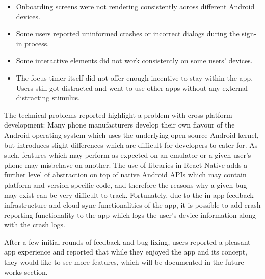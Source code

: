 \begin{itemize}
	\item Onboarding screens were not rendering consistently across different Android devices.
	\item Some users reported uninformed crashes or incorrect dialogs during the sign-in process.
	\item Some interactive elements did not work consistently on some users' devices.
	\item The focus timer itself did not offer enough incentive to stay within the app. Users still got distracted and went to use other apps without any external distracting stimulus.
\end{itemize}

The technical problems reported highlight a problem with cross-platform development: Many phone manufacturers develop their own flavour of the Android operating system which uses the underlying open-source Android kernel, but introduces slight differences which are difficult for developers to cater for. As such, features which may perform as expected on an emulator or a given user's phone may misbehave on another. The use of libraries in React Native adds a further level of abstraction on top of native Android APIs which may contain platform and version-specific code, and therefore the reasons why a given bug may exist can be very difficult to track. Fortunately, due to the in-app feedback infrastructure and cloud-sync functionalities of the app, it is possible to add crash reporting functionality to the app which logs the user's device information along with the crash logs.

After a few initial rounds of feedback and bug-fixing, users reported a pleasant app experience and reported that while they enjoyed the app and its concept, they would like to see more features, which will be documented in the future works section.